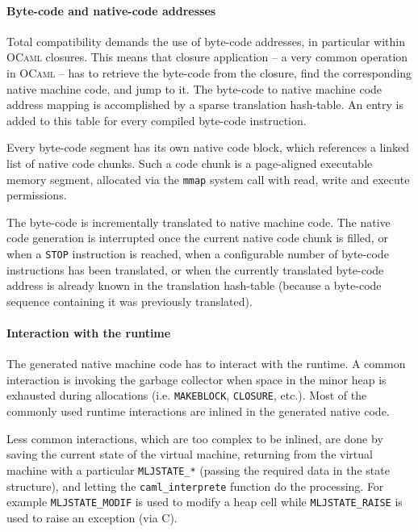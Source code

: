 \documentclass[a4paper]{acm_proc_article-sp}
\begin{document}
\paragraph{Byte-code and native-code addresses}

Total compatibility demands the use of byte-code addresses, in particular within \textsc{OCaml}
closures. This means that closure application -- a very common operation in \textsc{OCaml} -- has
to retrieve the byte-code from the closure, find the corresponding native machine code, and jump to
it. The byte-code to native machine code address mapping is accomplished by a sparse 
translation hash-table. An entry is added to this table for every compiled byte-code instruction.

Every byte-code segment has its own native code block, which references a linked list of native
code chunks. Such a code chunk is a page-aligned executable memory segment, allocated via the
\texttt{mmap} system call with read, write and execute permissions.

The byte-code is incrementally translated to native machine code. The native code generation is
interrupted once the current native code chunk is filled, or when a \texttt{STOP} instruction is
reached, when a configurable number of byte-code instructions has been translated, or when the
currently translated byte-code address is already known in the translation hash-table
(because a byte-code sequence containing it was previously translated).

\paragraph{Interaction with the runtime}

The generated native machine code has to interact with the runtime. A common interaction is
invoking the garbage collector when space in the minor heap is exhausted during allocations
(i.e. \texttt{MAKEBLOCK}, \texttt{CLOSURE}, etc.). Most of the commonly used runtime interactions
are inlined in the generated native code.

Less common interactions, which are too complex to be inlined, are done by saving the current
state of the virtual machine, returning from the virtual machine with a particular
\texttt{MLJSTATE\_*} (passing the required data in the state structure), and letting the
\texttt{caml\_interprete} function do the processing. For example \texttt{MLJSTATE\_MODIF} is
used to modify a heap cell while \texttt{MLJSTATE\_RAISE} is used to raise an exception (via C).
\end{document}
